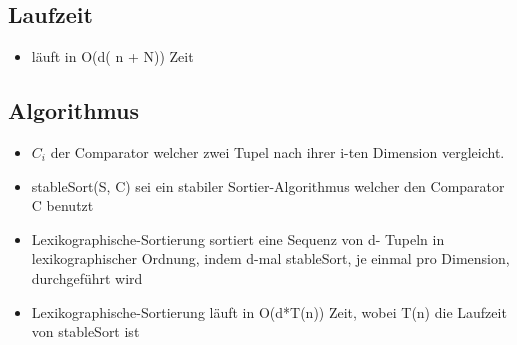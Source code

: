 \subsection{Laufzeit}
\begin{itemize}
    \item läuft in O(d( n + N)) Zeit
\end{itemize}

\subsection{Algorithmus}
\begin{itemize}
    \item $C_i$ der Comparator welcher zwei Tupel nach ihrer i-ten Dimension vergleicht.
    \item stableSort(S, C) sei ein stabiler Sortier-Algorithmus welcher den Comparator C benutzt
    \item Lexikographische-Sortierung sortiert eine Sequenz von d- Tupeln in lexikographischer Ordnung, indem d-mal stableSort, je einmal pro Dimension, durchgeführt wird
    \item Lexikographische-Sortierung läuft in O(d*T(n)) Zeit, wobei T(n) die Laufzeit von stableSort ist
\end{itemize}


